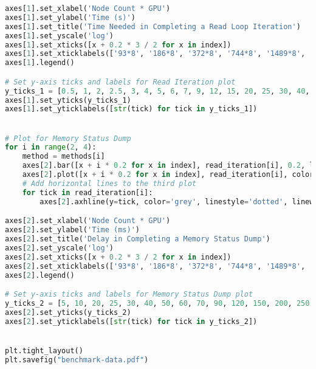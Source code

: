 \begin{lstlisting}[language=Python]
axes[1].set_xlabel('Node Count * GPU')
axes[1].set_ylabel('Time (s)')
axes[1].set_title('Time Needed in Completing a Read Loop Iteration')
axes[1].set_yscale('log')
axes[1].set_xticks([x + 0.2 * 3 / 2 for x in index])
axes[1].set_xticklabels(['93*8', '186*8', '372*8', '744*8', '1489*8', '2978*8'])
axes[1].legend()

# Set y-axis ticks and labels for Read Iteration plot
y_ticks_1 = [0.5, 1, 2, 2.5, 3, 4, 5, 6, 7, 9, 12, 15, 20, 25, 30, 40, 50, 60]
axes[1].set_yticks(y_ticks_1)
axes[1].set_yticklabels([str(tick) for tick in y_ticks_1])


# Plot for Memory Status Dump
for i in range(2, 4):
    method = methods[i]
    axes[2].bar([x + i * 0.2 for x in index], read_iteration[i], 0.2, label=method, color=colors[i])
    axes[2].plot([x + i * 0.2 for x in index], read_iteration[i], color=colors[i], marker='o', linewidth=1, markersize=2)
    # Add horizontal lines to the third plot
    for tick in read_iteration[i]:
        axes[2].axhline(y=tick, color='grey', linestyle='dotted', linewidth=0.3)

axes[2].set_xlabel('Node Count * GPU')
axes[2].set_ylabel('Time (ms)')
axes[2].set_title('Delay in Completing a Memory Status Dump')
axes[2].set_yscale('log')
axes[2].set_xticks([x + 0.2 * 3 / 2 for x in index])
axes[2].set_xticklabels(['93*8', '186*8', '372*8', '744*8', '1489*8', '2978*8'])
axes[2].legend()

# Set y-axis ticks and labels for Memory Status Dump plot
y_ticks_2 = [5, 10, 20, 25, 30, 40, 50, 60, 70, 90, 120, 150, 200, 250, 300, 400, 500]
axes[2].set_yticks(y_ticks_2)
axes[2].set_yticklabels([str(tick) for tick in y_ticks_2])


plt.tight_layout()
plt.savefig("benchmark-data.pdf")
\end{lstlisting}
